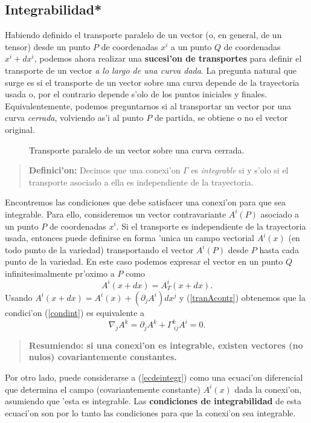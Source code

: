 \subsection{Integrabilidad*}\label{sec:integ}
Habiendo definido el transporte paralelo de un vector (o, en
general, de un tensor) desde un punto $P$
de coordenadas $x^i $ a un punto $Q$ de coordenadas $x^i +dx^i$, podemos
ahora realizar una \textbf{sucesi'on de transportes} para definir el transporte de un vector \textit{a lo largo de una curva dada}. La pregunta natural que surge es si el transporte de un vector sobre una curva depende de la trayectoria usada o, por el contrario depende s'olo de los puntos iniciales y finales. Equivalentemente, podemos preguntarnos si al transportar un vector por una curva \textit{cerrada}, volviendo as'i al punto $P$ de partida, se obtiene o no el vector original.
\begin{center}
\begin{figure}[H]
\centerline{}
\caption{Transporte paralelo de un vector sobre una curva cerrada.}
\label{dibujo}
\end{figure}
\end{center}
\begin{quotation}
\textbf{Definici'on:} Decimos que una conexi'on $\Gamma$ es \textit{integrable} si y s'olo si el transporte asociado a ella es independiente de la trayectoria.
\end{quotation}
Encontremos las condiciones que debe satisfacer una conexi'on para que sea
integrable.
Para ello, consideremos un vector contravariante $A^i(P)$ asociado a un punto
$P$ de coordenadas $x^i$. Si el transporte es independiente de la trayectoria
usada, entonces puede definirse en forma 'unica un campo vectorial $A^i(x)$ (en todo punto de la variedad) transportando el vector $A^i(P)$ desde $P$ hasta cada punto de la variedad. En este caso podemos expresar el vector en un punto $Q$ infinitesimalmente
pr'oximo a $P$ como
\begin{equation}
A^i(x+dx)=A^i_T(x+dx) . \label{condint}
\end{equation}
Usando $A^i(x+dx)=A^i(x)+(\partial_j A^i)dx^j $ y (\ref{tranAcontr}) obtenemos que
la condici'on (\ref{condint}) es equivalente a
\begin{equation}
\nabla_j A^k=\partial_j A^k+\Gamma_{\ ij}^k A^i =0.
\label{ecdeintegr}%
\end{equation}
\begin{quotation}
\textbf{Resumiendo: si una conexi'on es integrable, existen vectores (no nulos) covariantemente constantes.}
\end{quotation}
Por otro lado, puede considerarse a (\ref{ecdeintegr}) como una ecuaci'on
diferencial que determina el campo (covariantemente constante) $A^i(x)$ dada la conexi'on, asumiendo que 'esta es integrable. Las \textbf{condiciones de
integrabilidad} de esta ecuaci'on son por lo tanto las condiciones para que la
conexi'on sea integrable.


